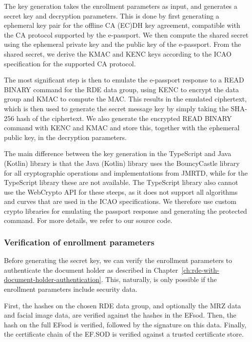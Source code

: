 The key generation takes the enrollment parameters as input, and generates a secret key and decryption parameters.
This is done by first generating a ephemeral key pair for the offline CA (EC)DH key agreement, compatible with the CA protocol supported by the e-passport.
We then compute the shared secret using the ephemeral private key and the public key of the e-passport.
From the shared secret, we derive the KMAC and KENC keys according to the ICAO specification for the supported CA protocol.

The most significant step is then to emulate the e-passport response to a READ BINARY command for the RDE data group, using KENC to encrypt the data group and KMAC to compute the MAC.
This results in the emulated ciphertext, which is then used to generate the secret message key by simply taking the SHA-256 hash of the ciphertext.
We also generate the encrypted READ BINARY command with KENC and KMAC and store this, together with the ephemeral public key, in the decryption parameters.

The main difference between the key generation in the TypeScript and Java (Kotlin) library is that the Java (Kotlin) library uses the BouncyCastle library for all cryptographic operations and implementations from JMRTD, while for the TypeScript library these are not available.
The TypeScript library also cannot use the WebCrypto API for these steeps, as it does not support all algorithms and curves that are used in the ICAO specifications.
We therefore use custom crypto libraries for emulating the passport response and generating the protected command.
For more details, we refer to our source code.

\subsubsection{Verification of enrollment parameters}\label{subsubsec:verification-of-enrollment-parameters}
Before generating the secret key, we can verify the enrollment parameters to authenticate the document holder as described in Chapter~\ref{ch:rde-with-document-holder-authentication}.
This, naturally, is only possible if the enrollment parameters include security data.

First, the hashes on the chosen RDE data group, and optionally the MRZ data and facial image data, are verified against the hashes in the EFsod.
Then, the hash on the full EFsod is verified, followed by the signature on this data.
Finally, the certificate chain of the EF.SOD is verified against a trusted certificate store.


